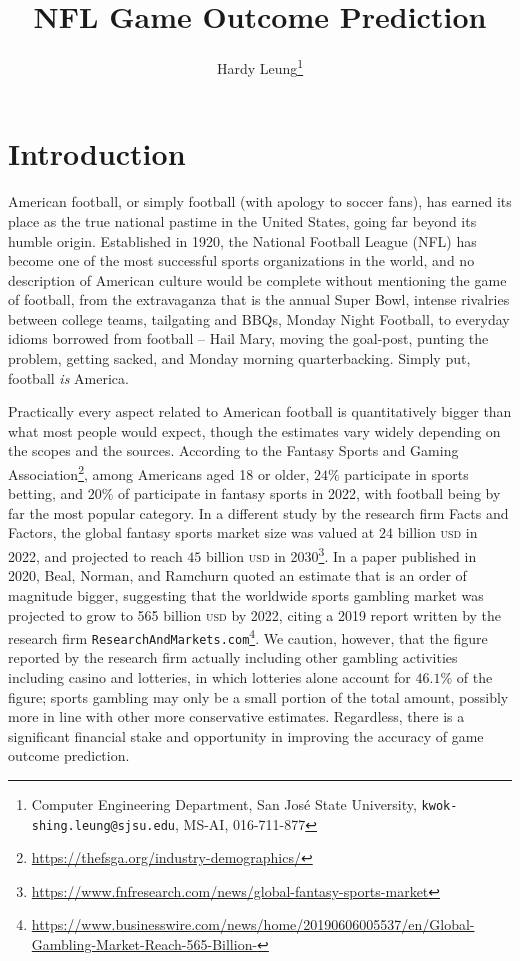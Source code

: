 \documentclass[10pt]{article}
\title{NFL Game Outcome Prediction}
\date{}
\begin{document}
\author{
Hardy Leung\thanks{
Computer Engineering Department, San José State University, \texttt{kwok-shing.leung@sjsu.edu}, MS-AI, 016-711-877} }

\maketitle

\section{Introduction}

American football, or simply football (with apology to soccer fans), has earned
its place as the true national pastime in the United States,
going far beyond its humble origin. Established in 1920,
the National Football League (NFL)
has become one of the most successful sports organizations in the world,
and no description of American culture would be complete without
mentioning the game of football, from the
extravaganza that is the annual Super Bowl, intense rivalries between
college teams, tailgating and BBQs, Monday Night Football, to
everyday idioms borrowed from football -- Hail Mary, moving the goal-post,
punting the problem, getting sacked, and Monday morning quarterbacking.
Simply put, football {\em is} America.

Practically every aspect related to American football is quantitatively
bigger than what most people would expect,
though the estimates vary
widely depending on the scopes and the sources.
According to the Fantasy Sports and Gaming Association\footnote{
\url{https://thefsga.org/industry-demographics/}},
among Americans aged 18 or
older, $24\%$ participate in sports betting, and $20\%$ of participate in
fantasy sports in 2022, with football being by far the most popular category.
In a different study by the research firm Facts and Factors, the
global fantasy sports market size was valued at $24$ billion \textsc{usd}
in 2022,
and projected to reach $45$ billion \textsc{usd} in 2030\footnote{
\url{https://www.fnfresearch.com/news/global-fantasy-sports-market}}.
In a paper published in 2020, Beal, Norman, and Ramchurn \cite{BeNo2020}
 quoted an estimate that is an order of magnitude
bigger,
suggesting that the worldwide sports gambling market was projected to grow
to 565 billion \textsc{usd} by 2022, citing a 2019 report written
by the research firm \texttt{ResearchAndMarkets.com}\footnote{
\url{https://www.businesswire.com/news/home/20190606005537/en/Global-Gambling-Market-Reach-565-Billion-}}. We caution, however, that the figure reported
by the research firm actually including other gambling activities including
casino and lotteries, in which lotteries alone account for $46.1\%$ of
the figure; sports gambling may only be a small portion of the
total amount, possibly more in line with other more conservative estimates.
Regardless,
there is a significant financial stake and opportunity
in improving the accuracy of game outcome prediction.
\end{document}

